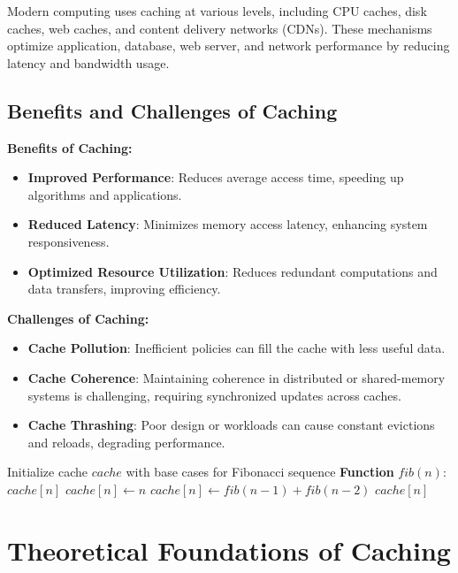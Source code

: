 \documentclass[12pt]{book} %
\begin{document}
Modern computing uses caching at various levels, including CPU caches, disk caches, web caches, and content delivery networks (CDNs). These mechanisms optimize application, database, web server, and network performance by reducing latency and bandwidth usage.

\subsection{Benefits and Challenges of Caching}

\textbf{Benefits of Caching:}
\begin{itemize}
    \item \textbf{Improved Performance}: Reduces average access time, speeding up algorithms and applications.
    \item \textbf{Reduced Latency}: Minimizes memory access latency, enhancing system responsiveness.
    \item \textbf{Optimized Resource Utilization}: Reduces redundant computations and data transfers, improving efficiency.
\end{itemize}

\textbf{Challenges of Caching:}
\begin{itemize}
    \item \textbf{Cache Pollution}: Inefficient policies can fill the cache with less useful data.
    \item \textbf{Cache Coherence}: Maintaining coherence in distributed or shared-memory systems is challenging, requiring synchronized updates across caches.
    \item \textbf{Cache Thrashing}: Poor design or workloads can cause constant evictions and reloads, degrading performance.
\end{itemize}

\FloatBarrier
\begin{algorithm}
\caption{Example of Caching with Fibonacci Sequence}
\begin{algorithmic}[1]
\State Initialize cache $cache$ with base cases for Fibonacci sequence
\State \textbf{Function} $fib(n)$:
        \Return $cache[n]$
    \EndIf
        \State $cache[n] \leftarrow n$
    \Else
        \State $cache[n] \leftarrow fib(n-1) + fib(n-2)$
    \EndIf
    \Return $cache[n]$
\end{algorithmic}
\end{algorithm}
\FloatBarrier

\section{Theoretical Foundations of Caching}
\end{document}
